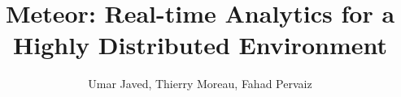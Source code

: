 \documentclass{article}
\begin{document}
\title{Meteor: Real-time Analytics for a Highly Distributed Environment}
\author{Umar Javed, Thierry Moreau, Fahad Pervaiz}

\maketitle










\end{document}

